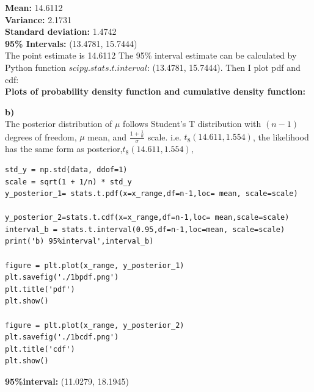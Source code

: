 \documentclass{article}
\begin{document}
\textbf{Mean:} 14.6112\\
\textbf{Variance:} 2.1731\\
\textbf{Standard deviation:} 1.4742\\
\textbf{95\% Intervals:} (13.4781, 15.7444)\\

The point estimate is 14.6112 The 95\% interval estimate can be calculated by Python function $scipy.stats.t.interval$: (13.4781, 15.7444). Then I plot pdf and cdf: \\

\textbf{Plots of probability density function and cumulative density function:}
\begin{figure}[H]
\centering  
{}
\label{Fig}
\end{figure}


\textbf{b)}\\
The posterior distribution of $\mu$ follows Student's T distribution with $(n-1)$degrees of freedom, $\mu$ mean, and $\frac{1+\frac{1}{n}}\sigma$ scale. i.e. $t_8(14.611, 1.554)$, the likelihood has the same form as posterior,$t_8(14.611, 1.554)$,
\begin{verbatim}  
std_y = np.std(data, ddof=1)
scale = sqrt(1 + 1/n) * std_y
y_posterior_1= stats.t.pdf(x=x_range,df=n-1,loc= mean, scale=scale)

y_posterior_2=stats.t.cdf(x=x_range,df=n-1,loc= mean,scale=scale)
interval_b = stats.t.interval(0.95,df=n-1,loc=mean, scale=scale)
print('b) 95%interval',interval_b)

figure = plt.plot(x_range, y_posterior_1)
plt.savefig('./1bpdf.png')
plt.title('pdf')
plt.show()

figure = plt.plot(x_range, y_posterior_2)
plt.savefig('./1bcdf.png')
plt.title('cdf')
plt.show()
\end{verbatim}
\textbf{95\%interval:} (11.0279, 18.1945)\\
\end{document}

